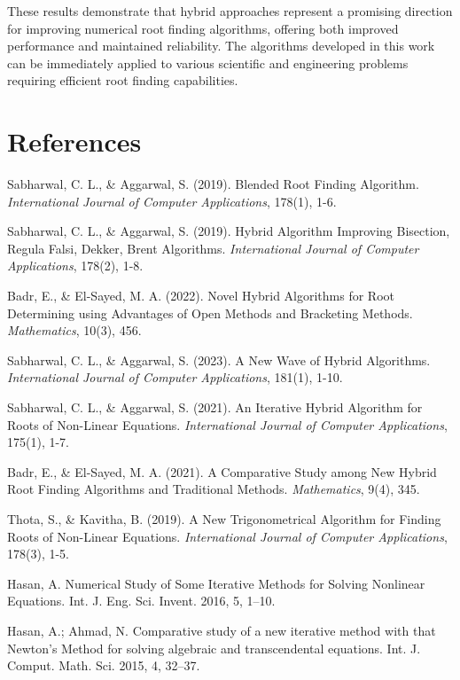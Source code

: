 \documentclass[11pt,a4paper]{article}
\begin{document}
These results demonstrate that hybrid approaches represent a promising direction for improving numerical root finding algorithms, offering both improved performance and maintained reliability. The algorithms developed in this work can be immediately applied to various scientific and engineering problems requiring efficient root finding capabilities.

\section*{References}

\begin{thebibliography}{99}

Sabharwal, C. L., \& Aggarwal, S. (2019). Blended Root Finding Algorithm. \textit{International Journal of Computer Applications}, 178(1), 1-6.

Sabharwal, C. L., \& Aggarwal, S. (2019). Hybrid Algorithm Improving Bisection, Regula Falsi, Dekker, Brent Algorithms. \textit{International Journal of Computer Applications}, 178(2), 1-8.

Badr, E., \& El-Sayed, M. A. (2022). Novel Hybrid Algorithms for Root Determining using Advantages of Open Methods and Bracketing Methods. \textit{Mathematics}, 10(3), 456.

Sabharwal, C. L., \& Aggarwal, S. (2023). A New Wave of Hybrid Algorithms. \textit{International Journal of Computer Applications}, 181(1), 1-10.

Sabharwal, C. L., \& Aggarwal, S. (2021). An Iterative Hybrid Algorithm for Roots of Non-Linear Equations. \textit{International Journal of Computer Applications}, 175(1), 1-7.

Badr, E., \& El-Sayed, M. A. (2021). A Comparative Study among New Hybrid Root Finding Algorithms and Traditional Methods. \textit{Mathematics}, 9(4), 345.

Thota, S., \& Kavitha, B. (2019). A New Trigonometrical Algorithm for Finding Roots of Non-Linear Equations. \textit{International Journal of Computer Applications}, 178(3), 1-5.

 Hasan, A. Numerical Study of Some Iterative Methods for Solving Nonlinear Equations. Int. J. Eng. Sci. Invent. 2016, 5, 1–10.

 Hasan, A.; Ahmad, N. Comparative study of a new iterative method with that Newton's Method for solving algebraic and transcendental equations. Int. J. Comput. Math. Sci. 2015, 4, 32–37.


\end{thebibliography}
\end{document}
